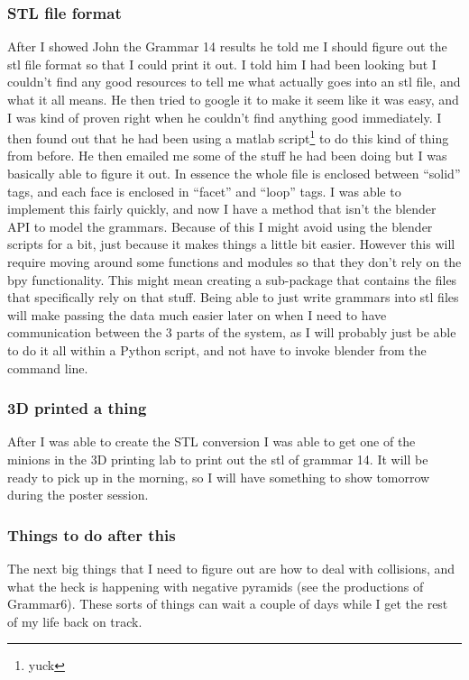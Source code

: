 \documentclass[letterpaper,oneside,titlepage]{article}
\begin{document}
\subsubsection{STL file format}
After I showed John the Grammar 14 results he told me I should figure out the stl file format so that I could print it out.  I told him I had been looking but I couldn't find any good resources to tell me what actually goes into an stl file, and what it all means.  He then tried to google it to make it seem like it was easy, and I was kind of proven right when he couldn't find anything good immediately.  I then found out that he had been using a matlab script\footnote{yuck} to do this kind of thing from before.  He then emailed me some of the stuff he had been doing but I was basically able to figure it out.  In essence the whole file is enclosed between ``solid'' tags, and each face is enclosed in ``facet'' and ``loop'' tags.  I was able to implement this fairly quickly, and now I have a method that isn't the blender API to model the grammars.  Because of this I might avoid using the blender scripts for a bit, just because it makes things a little bit easier.  However this will require moving around some functions and modules so that they don't rely on the bpy functionality.  This might mean creating a sub-package that contains the files that specifically rely on that stuff.  Being able to just write grammars into stl files will make passing the data much easier later on when I need to have communication between the 3 parts of the system, as I will probably just be able to do it all within a Python script, and not have to invoke blender from the command line.

\subsubsection{3D printed a thing}
After I was able to create the STL conversion I was able to get one of the minions in the 3D printing lab to print out the stl of grammar 14.  It will be ready to pick up in the morning, so I will have something to show tomorrow during the poster session.

\subsubsection{Things to do after this}
The next big things that I need to figure out are how to deal with collisions, and what the heck is happening with negative pyramids (see the productions of Grammar6).  These sorts of things can wait a couple of days while I get the rest of my life back on track.
\end{document}
